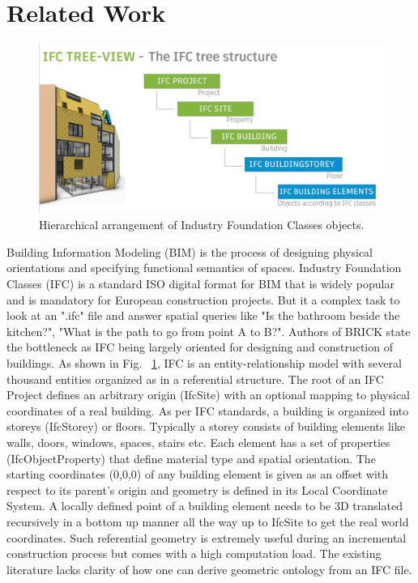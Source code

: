 \documentclass[conference]{IEEEtran}
\begin{document}
\section{Related Work}
\label{section:relatedwork}

\begin{figure}[]
\centering
  \includegraphics[width=0.7\linewidth]{./img/ifctree.png}
  \caption{Hierarchical arrangement of Industry Foundation Classes objects.}
  \label{fig:ifctree}
\end{figure}


Building Information Modeling (BIM) is the process of designing physical orientations and specifying functional semantics of spaces. Industry Foundation Classes (IFC) is a standard ISO digital format for BIM that is widely popular and is mandatory for European construction projects. But it a complex task to look at an ".ifc" file and answer spatial queries like "Is the bathroom beside the kitchen?", "What is the path to go from point A to B?". Authors of BRICK \cite{balaji2018brick} state the bottleneck as IFC being largely oriented for designing and construction of buildings. As shown in Fig. ~\ref{fig:ifctree}, IFC is an entity-relationship model with several thousand entities organized as in a referential structure.  The root of an IFC Project defines an arbitrary origin (IfcSite) with an optional mapping to physical coordinates of a real building. As per IFC standards, a building is organized into storeys (IfcStorey) or floors. Typically a storey consists of building elements like walls, doors, windows, spaces, stairs etc. Each element has a set of properties (IfcObjectProperty) that define material type and spatial orientation. The starting coordinates (0,0,0) of any building element is given as an offset with respect to its parent's origin and geometry is defined in its Local Coordinate System. A locally defined point of a building element needs to be 3D translated recursively in a bottom up manner all the way up to IfcSite to get the real world coordinates. Such referential geometry is extremely useful during an incremental construction process but comes with a high computation load. The existing literature lacks clarity of how one can derive geometric ontology from an IFC file.  
\end{document}
